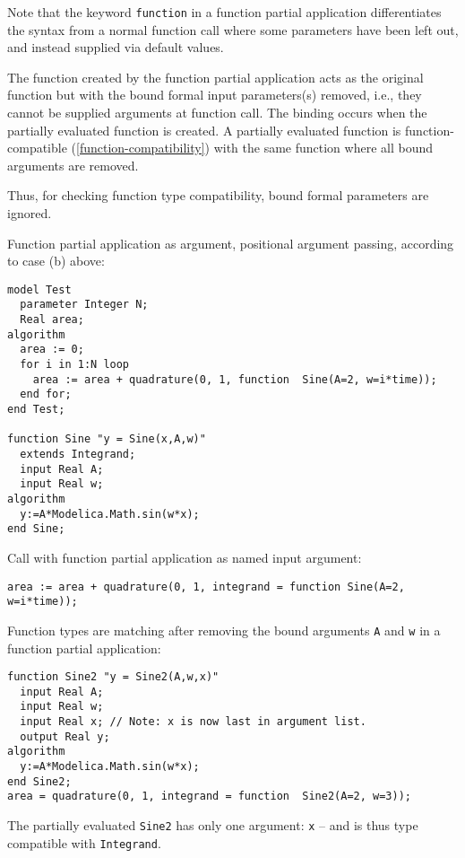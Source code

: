 \begin{nonnormative}
Note that the keyword \lstinline!function! in a function partial
application differentiates the syntax from a normal function call
where some parameters have been left out, and instead supplied via
default values.
\end{nonnormative}

The function created by the function partial application acts as the original function but with the bound formal input parameters(s) removed, i.e., they cannot be supplied arguments at function call.
The binding occurs when the partially evaluated function is created.
A partially evaluated function is function-compatible (\cref{function-compatibility}) with the same function where all bound arguments are removed.

\begin{nonnormative}
Thus, for checking function type compatibility, bound formal parameters are ignored.
\end{nonnormative}

\begin{example}
Function partial application as argument, positional argument passing, according to case (b) above:
\begin{lstlisting}[language=modelica]
model Test
  parameter Integer N;
  Real area;
algorithm
  area := 0;
  for i in 1:N loop
    area := area + quadrature(0, 1, function  Sine(A=2, w=i*time));
  end for;
end Test;

function Sine "y = Sine(x,A,w)"
  extends Integrand;
  input Real A;
  input Real w;
algorithm
  y:=A*Modelica.Math.sin(w*x);
end Sine;
\end{lstlisting}
Call with function partial application as named input argument:
\begin{lstlisting}[language=modelica]
area := area + quadrature(0, 1, integrand = function Sine(A=2, w=i*time));
\end{lstlisting}
\end{example}

\begin{example}
Function types are matching after removing the bound arguments \lstinline!A! and \lstinline!w! in a function partial
application:
\begin{lstlisting}[language=modelica]
function Sine2 "y = Sine2(A,w,x)"
  input Real A;
  input Real w;
  input Real x; // Note: x is now last in argument list.
  output Real y;
algorithm
  y:=A*Modelica.Math.sin(w*x);
end Sine2;
area = quadrature(0, 1, integrand = function  Sine2(A=2, w=3));
\end{lstlisting}
The partially evaluated \lstinline!Sine2! has only one argument: \lstinline!x! -- and is thus type compatible with \lstinline!Integrand!.
\end{example}

